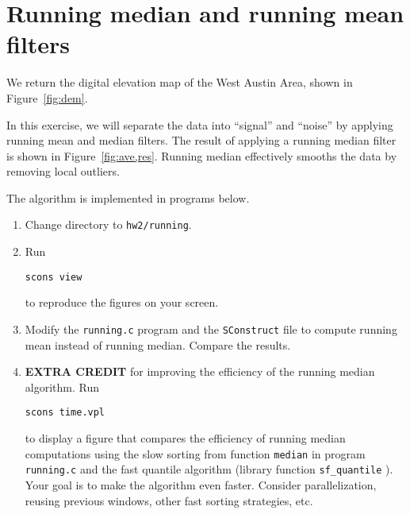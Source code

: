 \section{Running median and running mean filters}


We return the digital elevation map of the West Austin Area, shown in Figure~\ref{fig:dem}.

In this exercise, we will separate the data into ``signal'' and
``noise'' by applying running mean and median filters.  The result of
applying a running median filter is shown in
Figure~\ref{fig:ave,res}. Running median effectively smooths the data
by removing local outliers.


The algorithm is implemented in programs below.

\lstset{language=c,numbers=left,numberstyle=\tiny,showstringspaces=false}


\lstset{language=python,numbers=left,numberstyle=\tiny,showstringspaces=false}


\begin{enumerate}
\item Change directory to \texttt{hw2/running}.
\item Run 
\begin{verbatim}
scons view
\end{verbatim}
to reproduce the figures on your screen.
\item Modify the \texttt{running.c} program and the
  \texttt{SConstruct} file to compute running mean instead of running
  median. Compare the results.
\item \textbf{EXTRA CREDIT} for improving the efficiency of the
  running median algorithm. Run
\begin{verbatim}
scons time.vpl
\end{verbatim}
  to display a figure that compares the efficiency of running median
  computations using the slow sorting from function \texttt{median} in
  program \texttt{running.c} and the fast quantile algorithm (library
  function \texttt{sf\_quantile} ). Your goal is to make the algorithm
  even faster. Consider parallelization, reusing previous windows,
  other fast sorting strategies, etc.
\end{enumerate}

